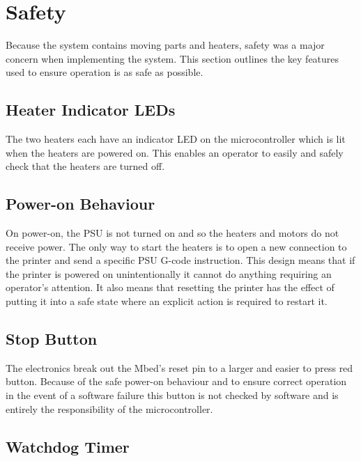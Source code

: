 	\section{Safety}
		
		Because the system contains moving parts and heaters, safety was a major
		concern when implementing the system. This section outlines the key features
		used to ensure operation is as safe as possible.
		
		\subsection{Heater Indicator LEDs}
			
			The two heaters each have an indicator LED on the microcontroller which is
			lit when the heaters are powered on. This enables an operator to easily
			and safely check that the heaters are turned off.
		
		\subsection{Power-on Behaviour}
			
			On power-on, the PSU is not turned on and so the heaters and motors do not
			receive power. The only way to start the heaters is to open a new
			connection to the printer and send a specific PSU G-code instruction.
			This design means that if the printer is powered on unintentionally it
			cannot do anything requiring an operator's attention. It also means that
			resetting the printer has the effect of putting it into a safe state where
			an explicit action is required to restart it.
		
		\subsection{Stop Button}
			
			The electronics break out the Mbed's reset pin to a larger and easier to
			press red button. Because of the safe power-on behaviour and to ensure
			correct operation in the event of a software failure this button is not
			checked by software and is entirely the responsibility of the
			microcontroller.
			
		
		\subsection{Watchdog Timer}
			
